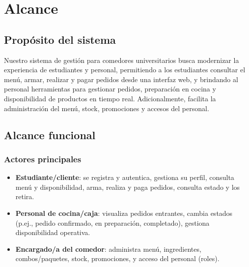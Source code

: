\section{Alcance}

\subsection{Propósito del sistema}
Nuestro sistema de gestión para comedores universitarios busca modernizar la experiencia de estudiantes y personal, permitiendo a los estudiantes consultar el menú, armar, realizar y pagar pedidos desde una interfaz web, y brindando al personal herramientas para gestionar pedidos, preparación en cocina y disponibilidad de productos en tiempo real. Adicionalmente, facilita la administración del menú, stock, promociones y accesos del personal.

\subsection{Alcance funcional}
\subsubsection*{Actores principales}
\begin{itemize}
  \item \textbf{Estudiante/cliente}: se registra y autentica, gestiona su perfil, consulta menú y disponibilidad, arma, realiza y paga pedidos, consulta estado y los retira.
  \item \textbf{Personal de cocina/caja}: visualiza pedidos entrantes, cambia estados (p.ej., pedido confirmado, en preparación, completado), gestiona disponibilidad operativa.
  \item \textbf{Encargado/a del comedor}: administra menú, ingredientes, combos/paquetes, stock, promociones, y acceso del personal (roles).
\end{itemize}

